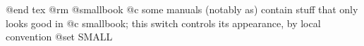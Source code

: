 @end tex
@rm
@smallbook
@c some manuals (notably as) contain stuff that only looks good in
@c smallbook; this switch controls its appearance, by local convention
@set SMALL
